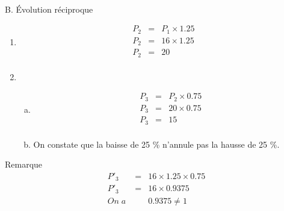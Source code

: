 \documentclass[xcolor={dvipsnames}]{beamer}
\begin{document}
\begin{frame}
\

B. \'Evolution réciproque \pause


\begin{enumerate}[1.]
\item \begin{eqnarray*}
	P_2 &=& P_1 \times \num{1.25} \\
	P_2 &=& 16 \times  \num{1.25} \\
	P_2 &=& 20\\
\end{eqnarray*}\pause

\vspace*{-0.5cm}

\item 
\begin{enumerate}[a.]
\item 

\begin{eqnarray*}
P_3 &=& P_2 \times \num{0.75} \\
P_3 &=& 20 \times  \num{0.75} \\
P_3 &=& 15\\
\end{eqnarray*}\pause

\vspace*{-0.5cm} 


\item On constate que la baisse de \num{25} \% n'annule pas la hausse de \num{25} \%.\pause
\end{enumerate}
\end{enumerate}

\end{frame}

\begin{frame}
	\begin{block}{Remarque}
		\begin{eqnarray*}
			P'_3 &=& \num{16} \times \num{1.25} \times \num{0.75} \\
			P'_3 &=& \num{16} \times \num{0.9375} \\
			On\;a\; & &\num{0.9375} \neq 1
		\end{eqnarray*}
	\end{block}
	
\end{frame}
\end{document}
